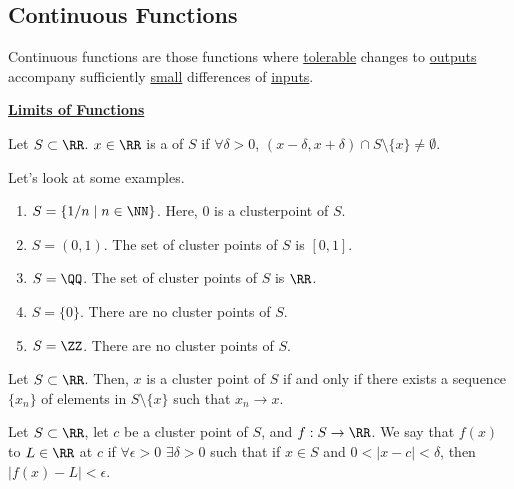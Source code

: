 

\subsection*{Continuous Functions}

\begin{remark}
Continuous functions are those functions where \underline{tolerable} changes to \underline{outputs} accompany sufficiently \underline{small} differences of \underline{inputs}.
\end{remark}

\noindent\underline{\textbf{Limits of Functions}}

\begin{definition}
Let $S\subset \RR$. $x\in \RR$ is a  of $S$ if $\forall \delta >0$, $(x-\delta, x+\delta) \cap S\setminus \{x\} \neq \emptyset$. 
\end{definition}

\noindent Let's look at some examples.
\begin{enumerate}
    \item $S = \{1/n \mid n\in\NN\}$. Here, $0$ is a clusterpoint of $S$.
    \item $S = (0,1)$. The set of cluster points of $S$ is $[0,1]$.
    \item $S = \QQ$. The set of cluster points of $S$ is $\RR$.
    \item $S = \{0\}$. There are no cluster points of $S$.
    \item $S = \ZZ$. There are no cluster points of $S$.
\end{enumerate}

\begin{theorem}
Let $S\subset \RR$. Then, $x$ is a cluster point of $S$ if and only if there exists a sequence $\{x_n\}$ of elements in $S\setminus \{x\}$ such that $x_n\to x$.
\end{theorem}

\begin{definition}
Let $S\subset \RR$, let $c$ be a cluster point of $S$, and $f:S\to \RR$. We say that $f(x)$  to $L\in \RR$ at $c$ if $\forall \epsilon>0$ $\exists \delta >0$ such that if $x\in S$ and $0<|x-c|<\delta$, then $|f(x)-L| < \epsilon$.
\end{definition}


